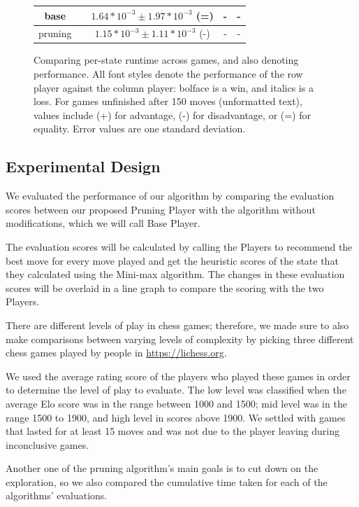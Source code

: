 \documentclass[letterpaper]{article}
\begin{document}
\begin{figure}[tb]
\begin{center}
{\begin{tabular}{|c|c|c|c|c|}
            \hline
            base & & ${1.64*10^{-3}\pm1.97*10^{-3}}$ (=) & - &-\\
            \hline
            pruning & & ${1.15*10^{-3}\pm1.11*10^{-3}}$ (-)& - &-\\
            \hline
        \end{tabular}
        }
        \caption{Comparing per-state runtime across games, and also denoting performance.  All font styles denote the performance of the row player against the column player: bolface is a win, and italics is a loss.  For games unfinished after 150 moves (unformatted text), values include (+) for advantage, (-) for disadvantage, or (=) for equality.  Error values are one standard deviation.}
        \label{pruningEval}
    \end{center}
\end{figure}
\subsection{Experimental Design}
We evaluated the performance of our algorithm by comparing the evaluation scores between our proposed Pruning Player with the algorithm without modifications, which we will call Base Player.

The evaluation scores will be calculated by calling the Players to recommend the best move for every move played and get the heuristic scores of the state that they calculated using the Mini-max algorithm. The changes in these evaluation scores will be overlaid in a line graph to compare the scoring with the two Players.

There are different levels of play in chess games; therefore, we made sure to also make comparisons between varying levels of complexity by picking three different chess games played by people in \url{https://lichess.org}. 

We used the average rating score of the players who played these games in order to determine the level of play to evaluate. The low level was classified when the average Elo score was in the range between 1000 and 1500; mid level was in the range 1500 to 1900, and high level in scores above 1900. We settled with games that lasted for at least 15 moves and was not due to the player leaving during inconclusive games.

Another one of the pruning algorithm’s main goals is to cut down on the exploration, so we also compared the cumulative time taken for each of the algorithms' evaluations.
\end{document}
